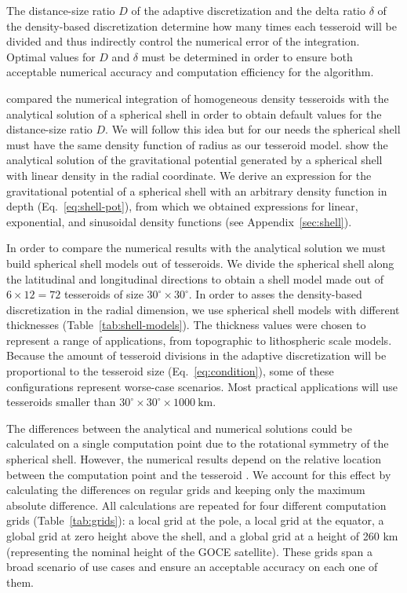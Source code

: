 \documentclass[extra, referee]{gji}
\begin{document}
The distance-size ratio $D$ of the adaptive discretization and the delta ratio $\delta$
of the density-based discretization determine how many times each tesseroid will be
divided and thus indirectly control the numerical error of the integration.
Optimal values for $D$ and $\delta$ must be determined in order to ensure both
acceptable numerical accuracy and computation efficiency for the algorithm.

\citet{Uieda2016} compared the numerical integration of homogeneous density tesseroids
with the analytical solution of a spherical shell \citep{Mikuska2006, Grombein2013} in
order to obtain default values for the distance-size ratio $D$.
We will follow this idea but for our needs the spherical shell must
have the same density function of radius as our tesseroid model.
\citet{Lin2018} show the analytical solution of the gravitational potential generated by
a spherical shell with linear density in the radial coordinate.
We derive an expression for the gravitational potential of a spherical shell with
an arbitrary density function in depth (Eq.~\ref{eq:shell-pot}),
from which we obtained
expressions for linear, exponential, and sinusoidal density functions
(see Appendix~\ref{sec:shell}).

In order to compare the numerical results with the analytical solution we must build
spherical shell models out of tesseroids.
We divide the spherical shell along the latitudinal and longitudinal directions to
obtain a shell model made out of $6 \times 12 = 72$ tesseroids of size
$30^\circ \times 30^\circ$.
In order to asses the density-based discretization in the radial dimension,
we use spherical shell models with different thicknesses (Table~\ref{tab:shell-models}).
The thickness values were chosen to represent a range of applications, from topographic
to lithospheric scale models.
Because the amount of tesseroid divisions in the adaptive discretization will be
proportional to the tesseroid size (Eq.~\ref{eq:condition}),
some of these configurations represent worse-case scenarios.
Most practical applications will use tesseroids smaller than
$30^\circ \times 30^\circ \times 1000\ \text{km}$.

The differences between the analytical and numerical solutions could be calculated on a
single computation point due to the rotational symmetry of the spherical shell.
However, the numerical results depend on the relative location between the computation
point and the tesseroid \citep{Ku1977, Asgharzadeh2007, Uieda2016}.
We account for this effect by calculating the differences on regular grids and keeping
only the maximum absolute difference.
All calculations are repeated for four different computation grids
(Table~\ref{tab:grids}):
a local grid at the pole, a local grid at the equator, a global grid at zero height
above the shell, and a global grid at a height of 260 km (representing the nominal
height of the GOCE satellite).
These grids span a broad scenario of use cases and ensure an acceptable accuracy on each
one of them.
\end{document}
